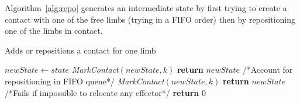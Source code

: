 \documentclass[journal]{IEEEtran}
\begin{document}
Algorithm~\ref{alg:repo} generates an intermediate state by first trying to create a contact with one of the free limbs (trying in a FIFO order) then by repositioning one of the limbs in contact.

\begin{algorithm}[!tbp]
\caption{Adds or repositions a contact for one limb} \label{interpolate}
	\begin{algorithmic}[1]
        \State $newState \gets state$
				\State \textit{MarkContact}$(newState,k)$			
				\State \textbf{return} $newState$
			\EndIf
		\EndFor
				\State /*Account for repositioning in FIFO queue*/		
				\State \textit{MarkContact}$(newState,k)$
				\State \textbf{return} $newState$
			\EndIf
		\EndFor
        \State
		/*Fails if impossible to relocate any effector*/
		\State \textbf{return} $0$
	\EndFunction
\end{algorithmic}
\label{alg:repo}
\end{algorithm}
\end{document}
